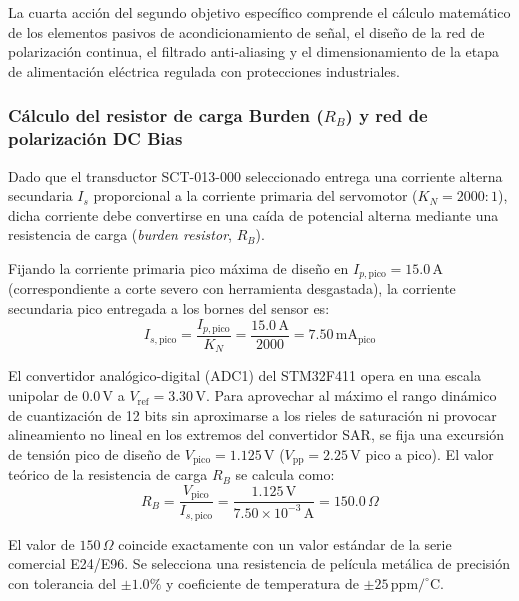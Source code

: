 La cuarta acción del segundo objetivo específico comprende el cálculo matemático de los elementos pasivos de acondicionamiento de señal, el diseño de la red de polarización continua, el filtrado anti-aliasing y el dimensionamiento de la etapa de alimentación eléctrica regulada con protecciones industriales.

\subsubsection{Cálculo del resistor de carga Burden (\texorpdfstring{$R_B$}{RB}) y red de polarización DC Bias}
\label{subsubsec:calculo_resistor_burden}

Dado que el transductor SCT-013-000 seleccionado entrega una corriente alterna secundaria $I_s$ proporcional a la corriente primaria del servomotor ($K_N = 2000:1$), dicha corriente debe convertirse en una caída de potencial alterna mediante una resistencia de carga (\textit{burden resistor}, $R_B$). 

Fijando la corriente primaria pico máxima de diseño en $I_{p,\text{pico}} = 15.0\,\text{A}$ (correspondiente a corte severo con herramienta desgastada), la corriente secundaria pico entregada a los bornes del sensor es:
\begin{equation}
I_{s,\text{pico}} = \frac{I_{p,\text{pico}}}{K_N} = \frac{15.0\,\text{A}}{2000} = 7.50\,\text{mA}_{\text{pico}}
\label{eq:mp_corriente_secundaria_pico}
\end{equation}

El convertidor analógico-digital (ADC1) del STM32F411 opera en una escala unipolar de $0.0\,\text{V}$ a $V_{\text{ref}} = 3.30\,\text{V}$. Para aprovechar al máximo el rango dinámico de cuantización de 12 bits sin aproximarse a los rieles de saturación ni provocar alineamiento no lineal en los extremos del convertidor SAR, se fija una excursión de tensión pico de diseño de $V_{\text{pico}} = 1.125\,\text{V}$ ($V_{\text{pp}} = 2.25\,\text{V}$ pico a pico). El valor teórico de la resistencia de carga $R_B$ se calcula como:
\begin{equation}
R_B = \frac{V_{\text{pico}}}{I_{s,\text{pico}}} = \frac{1.125\,\text{V}}{7.50 \times 10^{-3}\,\text{A}} = 150.0\,\Omega
\label{eq:mp_calculo_rb}
\end{equation}

El valor de $150\,\Omega$ coincide exactamente con un valor estándar de la serie comercial E24/E96. Se selecciona una resistencia de película metálica de precisión con tolerancia del $\pm 1.0\%$ y coeficiente de temperatura de $\pm 25\,\text{ppm/}^\circ\text{C}$.

